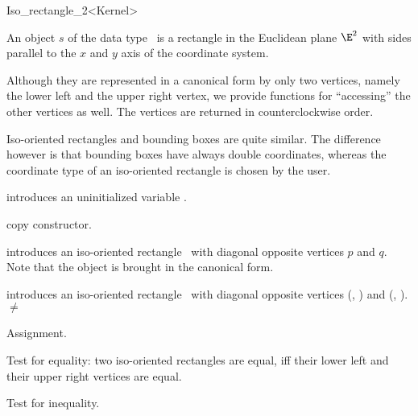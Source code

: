 \begin{ccRefClass} {Iso_rectangle_2<Kernel>}

\ccDefinition  An object $s$ of the data type \ccRefName\ is a
rectangle in the Euclidean plane $\E^2$ with sides parallel to the $x$ and
$y$ axis of the coordinate system.
 
Although they are represented in a canonical form by only two
vertices, namely the lower left and the upper right vertex, we provide
functions for ``accessing'' the other vertices as well. The vertices
are returned in counterclockwise order.

Iso-oriented rectangles and bounding boxes are quite similar. The
difference however is that bounding boxes have always double coordinates, 
whereas the coordinate type of an iso-oriented rectangle is chosen by
the user.

\ccCreation
{}


\ccHidden {}
             {introduces an uninitialized variable \ccVar.}

\ccHidden {}
            {copy constructor.}

            {introduces an iso-oriented rectangle \ccVar\ with diagonal
             opposite vertices $p$ and $q$. Note that the object is 
             brought in the canonical form.}

            {introduces an iso-oriented rectangle \ccVar\ with diagonal
             opposite vertices (, ) and 
             (, ).  
             \ccPrecond {} $\neq$  }

\ccOperations
\ccHidden {}
        {Assignment.}

       {Test for equality: two iso-oriented rectangles are equal, iff their
        lower left and their upper right vertices are equal.}

       {Test for inequality.}


\end{ccRefClass}

